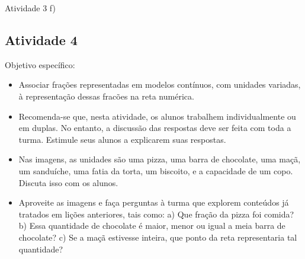 \begin{multicols}{2}
\begin{resposta*} {Atividade 3}
f)
 
 
\end{resposta*}




\subsection{Atividade 4}
  Objetivo específico:   
\begin{itemize} %
    \item       Associar frações representadas em modelos contínuos, com unidades variadas, à representação dessas fracões na reta numérica.
\end{itemize} %
  
  
\begin{itemize} %
    \item       Recomenda-se que, nesta atividade, os alunos trabalhem individualmente ou em duplas. No entanto, a discussão das respostas deve ser feita com toda a turma. Estimule seus alunos a explicarem suas respostas.
    \item       Nas imagens, as unidades são uma pizza, uma barra de chocolate, uma maçã, um sanduíche, uma fatia da torta, um biscoito, e a capacidade de um copo. Discuta isso com os alunos.
    \item       Aproveite as imagens e faça perguntas à turma que explorem conteúdos já tratados em lições anteriores, tais como: a) Que fração da pizza foi comida? b) Essa quantidade de chocolate é maior, menor ou igual a meia barra de chocolate? c) Se a maçã estivesse inteira, que ponto da reta representaria tal quantidade?  
\end{itemize} %


\end{multicols}
